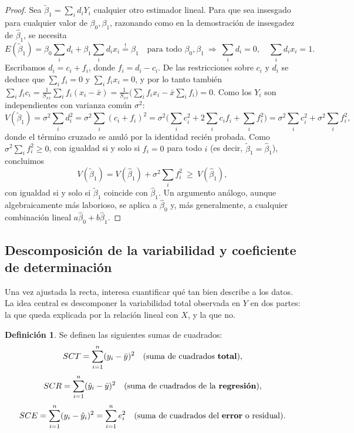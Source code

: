 \documentclass[11pt,a4paper]{article}
\theoremstyle{plain}
\theoremstyle{definition}
\newtheorem{definicion}[teorema]{Definición}
\theoremstyle{remark}
\begin{document}
\begin{proof}
Sea $\tilde\beta_1=\sum_i d_iY_i$ cualquier otro estimador lineal. Para que sea insesgado para cualquier valor de $\beta_0,\beta_1$, razonando como en la demostración de insesgadez de $\hat\beta_1$, se necesita
\[
E(\tilde\beta_1) = \beta_0\sum_i d_i + \beta_1\sum_i d_ix_i \overset{!}{=} \beta_1 \quad \text{para todo } \beta_0,\beta_1 \ \Longrightarrow\ \sum_i d_i = 0, \quad \sum_i d_ix_i=1.
\]
Escribamos $d_i=c_i+f_i$, donde $f_i=d_i-c_i$. De las restricciones sobre $c_i$ y $d_i$ se deduce que $\sum_i f_i=0$ y $\sum_i f_ix_i=0$, y por lo tanto también $\sum_i f_ic_i = \frac{1}{S_{xx}}\sum_i f_i(x_i-\bar x) = \frac{1}{S_{xx}}\Big(\sum_i f_ix_i - \bar x\sum_i f_i\Big) = 0$. Como los $Y_i$ son independientes con varianza común $\sigma^2$:
\[
V(\tilde\beta_1) = \sigma^2\sum_i d_i^2 = \sigma^2\sum_i (c_i+f_i)^2 = \sigma^2\Big(\sum_i c_i^2 + 2\sum_i c_if_i + \sum_i f_i^2\Big) = \sigma^2\sum_i c_i^2 + \sigma^2\sum_i f_i^2,
\]
donde el término cruzado se anuló por la identidad recién probada. Como $\sigma^2\sum_i f_i^2\geq 0$, con igualdad si y solo si $f_i=0$ para todo $i$ (es decir, $\tilde\beta_1=\hat\beta_1$), concluimos
\[
V(\tilde\beta_1) = V(\hat\beta_1) + \sigma^2\sum_i f_i^2 \ \geq\ V(\hat\beta_1),
\]
con igualdad si y solo si $\tilde\beta_1$ coincide con $\hat\beta_1$. Un argumento análogo, aunque algebraicamente más laborioso, se aplica a $\hat\beta_0$ y, más generalmente, a cualquier combinación lineal $a\hat\beta_0+b\hat\beta_1$.
\end{proof}

\subsection{Descomposición de la variabilidad y coeficiente de determinación}

Una vez ajustada la recta, interesa cuantificar qué tan bien describe a los datos. La idea central es descomponer la variabilidad total observada en $Y$ en dos partes: la que queda explicada por la relación lineal con $X$, y la que no.

\begin{definicion}
Se definen las siguientes sumas de cuadrados:
\[
SCT = \sum_{i=1}^n (y_i-\bar y)^2 \quad \text{(suma de cuadrados \textbf{total})},
\]
\[
SCR = \sum_{i=1}^n (\hat y_i-\bar y)^2 \quad \text{(suma de cuadrados de la \textbf{regresión})},
\]
\[
SCE = \sum_{i=1}^n (y_i-\hat y_i)^2 = \sum_{i=1}^n e_i^2 \quad \text{(suma de cuadrados del \textbf{error} o residual)}.
\]
\end{definicion}
\end{document}
